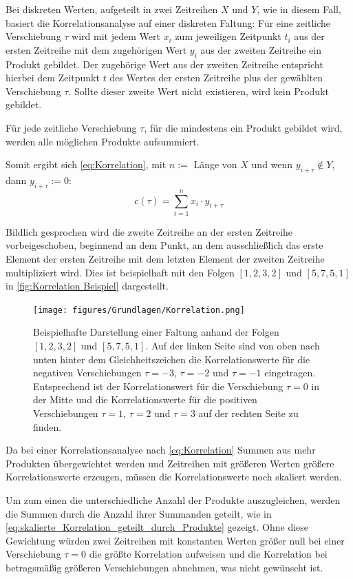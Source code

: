 Bei diskreten Werten, aufgeteilt in zwei Zeitreihen $X$ und $Y$, wie in diesem Fall, basiert die Korrelationsanalyse auf einer diskreten Faltung:
Für eine zeitliche Verschiebung $\tau$ wird mit jedem Wert $x_i$ zum jeweiligen Zeitpunkt $t_i$ aus der ersten Zeitreihe mit dem zugehörigen Wert $y_i$ aus der zweiten Zeitreihe ein Produkt gebildet. Der zugehörige Wert aus der zweiten Zeitreihe entspricht hierbei dem Zeitpunkt $t$ des Wertes der ersten Zeitreihe plus der gewählten Verschiebung $\tau$. Sollte dieser zweite Wert nicht existieren, wird kein Produkt gebildet.

Für jede zeitliche Verschiebung $\tau$, für die mindestens ein Produkt gebildet wird, werden alle möglichen Produkte aufsummiert.

Somit ergibt sich \autoref{eq:Korrelation}, mit $n := $ Länge von $X$ und wenn $y_{i+\tau} \not\in Y$, dann $y_{i+\tau} := 0$:
\begin{equation}\label{eq:Korrelation}
    c(\tau) = \sum_{i=1}^n x_i\cdot y_{i+\tau}
\end{equation}


Bildlich gesprochen wird die zweite Zeitreihe an der ersten Zeitreihe vorbeigeschoben, beginnend an dem Punkt, an dem ausschließlich das erste Element der ersten Zeitreihe mit dem letzten Element der zweiten Zeitreihe multipliziert wird. Dies ist beispielhaft mit den Folgen $[1,2,3,2]$ und $[5,7,5,1]$ in \autoref{fig:Korrelation Beispiel} dargestellt.

\begin{figure}[H]
    \centering
    \texttt{[image: figures/Grundlagen/Korrelation.png]}
    \caption{Beispielhafte Darstellung einer Faltung anhand der Folgen $[1,2,3,2]$ und $[5,7,5,1]$. Auf der linken Seite sind von oben nach unten hinter dem Gleichheitszeichen die Korrelationswerte für die negativen Verschiebungen $\tau=-3$, $\tau=-2$ und $\tau=-1$ eingetragen. Entsprechend ist der Korrelationswert für die Verschiebung $\tau=0$ in der Mitte und die Korrelationswerte für die positiven Verschiebungen $\tau=1$, $\tau=2$ und $\tau=3$ auf der rechten Seite zu finden.}
    \label{fig:Korrelation Beispiel}
\end{figure}

Da bei einer Korrelationsanalyse nach \autoref{eq:Korrelation} Summen aus mehr Produkten übergewichtet werden und Zeitreihen mit größeren Werten größere Korrelationswerte erzeugen, müssen die Korrelationswerte noch skaliert werden.

Um zum einen die unterschiedliche Anzahl der Produkte auszugleichen, werden die Summen durch die Anzahl ihrer Summanden geteilt, wie in \autoref{eq:skalierte_Korrelation_geteilt_durch_Produkte} gezeigt. Ohne diese Gewichtung würden zwei Zeitreihen mit konstanten Werten größer null bei einer Verschiebung $\tau=0$ die größte Korrelation aufweisen und die Korrelation bei betragsmäßig größeren Verschiebungen abnehmen, was nicht gewünscht ist.

